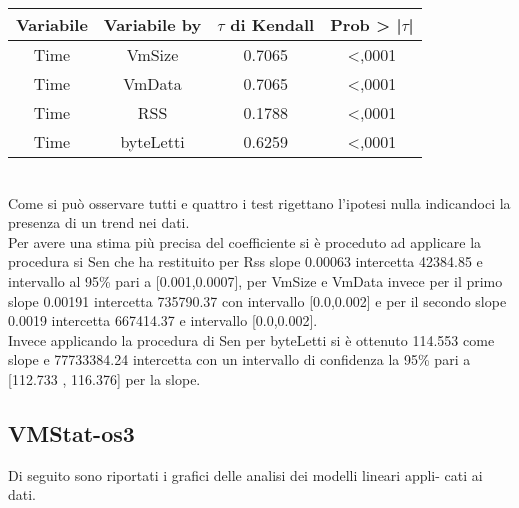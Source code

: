 \begin{table}[htbp]
    \centering
    \label{tab:esempio}
    \begin{tabular}{|c|c|c|c|} %
        \hline
        Variabile & Variabile by & $\tau$ di Kendall &Prob > |$\tau$| \\ %
        \hline
        Time & VmSize & 0.7065 & <,0001\\
        Time & VmData & 0.7065 & <,0001\\
        Time & RSS & 0.1788 & <,0001\\
        Time & byteLetti & 0.6259 & <,0001\\
        \hline
    \end{tabular}
\end{table} \\
Come si può osservare tutti e quattro i test rigettano l'ipotesi nulla indicandoci la presenza di un trend nei dati.\\
Per avere una stima più precisa del coefficiente si è proceduto ad applicare la procedura si Sen che ha restituito per Rss slope 0.00063 intercetta 42384.85 e intervallo al 95\% pari a [0.001,0.0007], per VmSize e VmData invece per il primo slope 0.00191 intercetta 735790.37 con intervallo [0.0,0.002] e per il secondo slope 0.0019 intercetta 667414.37 e intervallo [0.0,0.002].\\
Invece applicando la procedura di Sen per byteLetti si è ottenuto 114.553 come slope e 77733384.24 intercetta con un intervallo di confidenza la 95\% pari a [112.733 , 116.376] per la slope.
\newpage
\subsection{VMStat-os3}
Di seguito sono riportati i grafici delle analisi dei modelli lineari appli-
cati ai dati.

